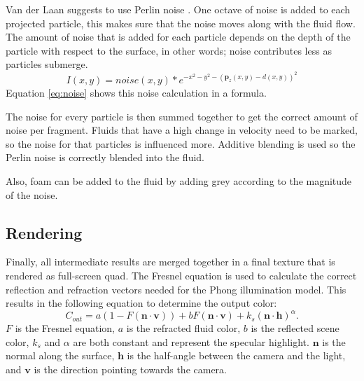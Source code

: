 Van der Laan \cite{van2009screen} suggests to use Perlin noise \cite{perlin1985image}.
One octave of noise is added to each projected particle, this makes sure that the noise moves along with the fluid flow.
The amount of noise that is added for each particle depends on the depth of the particle with respect to the surface, in other words; noise contributes less as particles submerge.
\begin{equation}
\label{eq:noise}
	I(x,y) = noise(x,y) \ast e^{-x^2 - y^2 - (\mathbf{p}_z(x,y)-d(x,y))^2}
\end{equation}
Equation \ref{eq:noise} shows this noise calculation in a formula.

The noise for every particle is then summed together to get the correct amount of noise per fragment.
Fluids that have a high change in velocity need to be marked, so the noise for that particles is influenced more.
Additive blending is used so the Perlin noise is correctly blended into the fluid.

Also, foam can be added to the fluid by adding grey according to the magnitude of the noise.

\subsection{Rendering}
Finally, all intermediate results are merged together in a final texture that is rendered as full-screen quad.
The Fresnel equation is used to calculate the correct reflection and refraction vectors needed for the Phong \cite{phong1975illumination} illumination model.
This results in the following equation \cite{van2009screen}to determine the output color:
\begin{equation}
\label{eq:shading}
C_{out} = a(1 - F(\mathbf{n} \cdot \mathbf{v})) + bF(\mathbf{n} \cdot \mathbf{v}) + k_s(\mathbf{n} \cdot \mathbf{h})^\alpha.
\end{equation}
$F$ is the Fresnel equation, $a$ is the refracted fluid color, $b$ is the reflected scene color, $k_s$ and $\alpha$ are both constant and represent the specular highlight. $\mathbf{n}$ is the normal along the surface, $\mathbf{h}$ is the half-angle between the camera and the light, and $\mathbf{v}$ is the direction pointing towards the camera.

